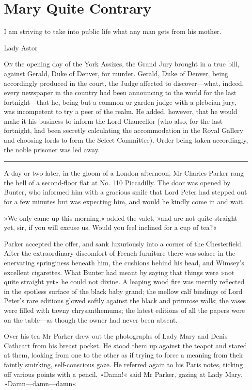 \chapter{Mary Quite Contrary}

\epigraph{I am striving to take into public life what any man gets from his mother.}{Lady Astor}


\lettrine[lines=4]{O}{n} the opening day of the York Assizes, the Grand Jury brought in a true bill, against Gerald, Duke of Denver, for murder. Gerald, Duke of Denver, being accordingly produced in the court, the Judge affected to discover—what, indeed, every newspaper in the country had been announcing to the world for the last fortnight—that he, being but a common or garden judge with a plebeian jury, was incompetent to try a peer of the realm. He added, however, that he would make it his business to inform the Lord Chancellor (who also, for the last fortnight, had been secretly calculating the accommodation in the Royal Gallery and choosing lords to form the Select Committee). Order being taken accordingly, the noble prisoner was led away.

\noindent\hfil\rule{0.5\textwidth}{.4pt}\hfil

A day or two later, in the gloom of a London afternoon, Mr Charles Parker rang the bell of a second-floor flat at No. 110 Piccadilly. The door was opened by Bunter, who informed him with a gracious smile that Lord Peter had stepped out for a few minutes but was expecting him, and would he kindly come in and wait.

»We only came up this morning,« added the valet, »and are not quite straight yet, sir, if you will excuse us. Would you feel inclined for a cup of tea?«

Parker accepted the offer, and sank luxuriously into a corner of the Chesterfield. After the extraordinary discomfort of French furniture there was solace in the enervating springiness beneath him, the cushions behind his head, and Wimsey's excellent cigarettes. What Bunter had meant by saying that things were »not quite straight yet« he could not divine. A leaping wood fire was merrily reflected in the spotless surface of the black baby grand; the mellow calf bindings of Lord Peter's rare editions glowed softly against the black and primrose walls; the vases were filled with tawny chrysanthemums; the latest editions of all the papers were on the table—as though the owner had never been absent.

Over his tea Mr Parker drew out the photographs of Lady Mary and Denis Cathcart from his breast pocket. He stood them up against the teapot and stared at them, looking from one to the other as if trying to force a meaning from their faintly smirking, self-conscious gaze. He referred again to his Paris notes, ticking off various points with a pencil.  »Damn!« said Mr Parker, gazing at Lady Mary. »Damn—damn—damn\longdash«

